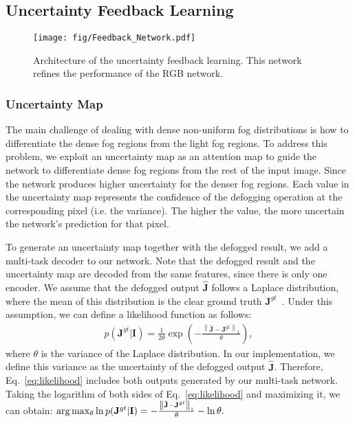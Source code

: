 \documentclass[runningheads]{llncs}
\begin{document}
\subsection{Uncertainty Feedback Learning}
\begin{figure}[t]
	\centering
	{\texttt{[image: fig/Feedback\_Network.pdf]}}\hfill
	\caption{Architecture of the uncertainty feedback learning. This network refines the performance of the RGB network.}
	\label{fig:feedback_net}
\end{figure}

\subsubsection{Uncertainty Map}
The main challenge of dealing with dense non-uniform fog distributions is how to differentiate the dense fog regions from the light fog regions.
To address this problem, we exploit an uncertainty map as an attention map to guide the network to differentiate dense fog regions from the rest of the input image. Since the network produces higher uncertainty for the denser fog regions.
Each value in the uncertainty map represents the confidence of the defogging operation at the corresponding pixel (i.e. the variance). The higher the value, the more uncertain the network's prediction for that pixel.

To generate an uncertainty map together with the defogged result, we add a multi-task decoder to our network.
Note that the defogged result and the uncertainty map are decoded from the same features, since there is only one encoder.
We assume that the defogged output $\mathbf{\hat{J}}$ follows a Laplace distribution, where the mean of this distribution is the clear ground truth $\mathbf{J}^{gt}$~\cite{kendall2017uncertainties,ning2021uncertainty}.
Under this assumption, we can define a likelihood function as follows:
\begin{align}
p(\mathbf{J}^{gt} | \mathbf{I}) = \frac{1}{2 \theta }  \exp (-\frac{\left \| \mathbf{\hat{J}} - \mathbf{J}^{gt} \right \|_1}{\theta}),
\label{eq:likelihood}
\end{align}
where $\theta$ is the variance of the Laplace distribution. In our implementation, we define this variance as the uncertainty of the defogged output $\mathbf{\hat{J}}$. Therefore, Eq.~\eqref{eq:likelihood} includes both outputs generated by our multi-task network. Taking the logarithm of both sides of Eq.~\eqref{eq:likelihood} and maximizing it, we can obtain:
$\arg \max_\theta \ln \space p(\mathbf{J}^{gt} | \mathbf{I})  =  -\frac{\left \| \mathbf{\hat{J}} - \mathbf{J}^{gt} \right \|_1}{\theta} -  \ln \theta .$
\end{document}

